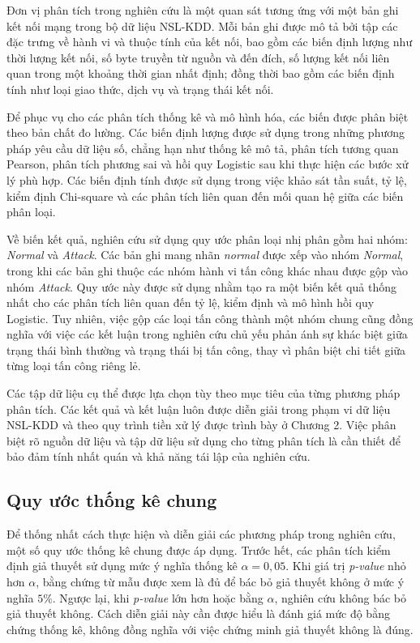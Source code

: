 \documentclass[../main.tex]{subfiles}
\begin{document}
Đơn vị phân tích trong nghiên cứu là một quan sát tương ứng với một bản ghi kết nối mạng trong bộ dữ liệu NSL-KDD. Mỗi bản ghi được mô tả bởi tập các đặc trưng về hành vi và thuộc tính của kết nối, bao gồm các biến định lượng như thời lượng kết nối, số byte truyền từ nguồn và đến đích, số lượng kết nối liên quan trong một khoảng thời gian nhất định; đồng thời bao gồm các biến định tính như loại giao thức, dịch vụ và trạng thái kết nối.

Để phục vụ cho các phân tích thống kê và mô hình hóa, các biến được phân biệt theo bản chất đo lường. Các biến định lượng được sử dụng trong những phương pháp yêu cầu dữ liệu số, chẳng hạn như thống kê mô tả, phân tích tương quan Pearson, phân tích phương sai và hồi quy Logistic sau khi thực hiện các bước xử lý phù hợp. Các biến định tính được sử dụng trong việc khảo sát tần suất, tỷ lệ, kiểm định Chi-square và các phân tích liên quan đến mối quan hệ giữa các biến phân loại.

Về biến kết quả, nghiên cứu sử dụng quy ước phân loại nhị phân gồm hai nhóm: \textit{Normal} và \textit{Attack}. Các bản ghi mang nhãn \textit{normal} được xếp vào nhóm \textit{Normal}, trong khi các bản ghi thuộc các nhóm hành vi tấn công khác nhau được gộp vào nhóm \textit{Attack}. Quy ước này được sử dụng nhằm tạo ra một biến kết quả thống nhất cho các phân tích liên quan đến tỷ lệ, kiểm định và mô hình hồi quy Logistic. Tuy nhiên, việc gộp các loại tấn công thành một nhóm chung cũng đồng nghĩa với việc các kết luận trong nghiên cứu chủ yếu phản ánh sự khác biệt giữa trạng thái bình thường và trạng thái bị tấn công, thay vì phân biệt chi tiết giữa từng loại tấn công riêng lẻ.

Các tập dữ liệu cụ thể được lựa chọn tùy theo mục tiêu của từng phương pháp phân tích. Các kết quả và kết luận luôn được diễn giải trong phạm vi dữ liệu NSL-KDD và theo quy trình tiền xử lý được trình bày ở Chương 2. Việc phân biệt rõ nguồn dữ liệu và tập dữ liệu sử dụng cho từng phân tích là cần thiết để bảo đảm tính nhất quán và khả năng tái lập của nghiên cứu.

\subsection{Quy ước thống kê chung}

Để thống nhất cách thực hiện và diễn giải các phương pháp trong nghiên cứu, một số quy ước thống kê chung được áp dụng. Trước hết, các phân tích kiểm định giả thuyết sử dụng mức ý nghĩa thống kê $\alpha = 0{,}05$. Khi giá trị \textit{p-value} nhỏ hơn $\alpha$, bằng chứng từ mẫu được xem là đủ để bác bỏ giả thuyết không ở mức ý nghĩa $5\%$. Ngược lại, khi \textit{p-value} lớn hơn hoặc bằng $\alpha$, nghiên cứu không bác bỏ giả thuyết không. Cách diễn giải này cần được hiểu là đánh giá mức độ bằng chứng thống kê, không đồng nghĩa với việc chứng minh giả thuyết không là đúng.
\end{document}
